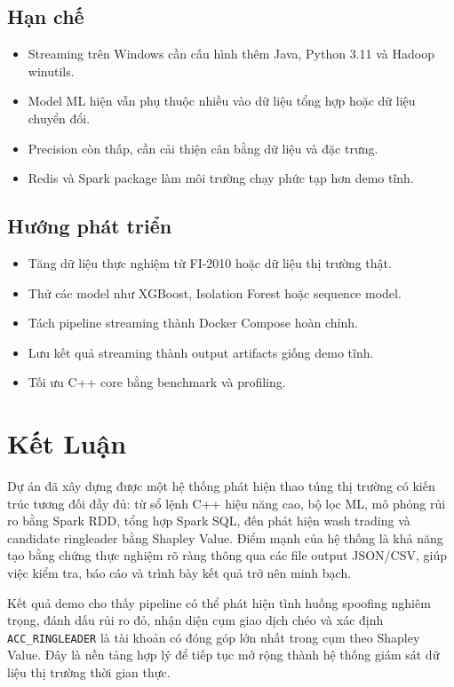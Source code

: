 \documentclass[12pt,a4paper]{report}
\begin{document}
\section{Hạn chế}

\begin{itemize}
    \item Streaming trên Windows cần cấu hình thêm Java, Python 3.11 và Hadoop winutils.
    \item Model ML hiện vẫn phụ thuộc nhiều vào dữ liệu tổng hợp hoặc dữ liệu chuyển đổi.
    \item Precision còn thấp, cần cải thiện cân bằng dữ liệu và đặc trưng.
    \item Redis và Spark package làm môi trường chạy phức tạp hơn demo tĩnh.
\end{itemize}

\section{Hướng phát triển}

\begin{itemize}
    \item Tăng dữ liệu thực nghiệm từ FI-2010 hoặc dữ liệu thị trường thật.
    \item Thử các model như XGBoost, Isolation Forest hoặc sequence model.
    \item Tách pipeline streaming thành Docker Compose hoàn chỉnh.
    \item Lưu kết quả streaming thành output artifacts giống demo tĩnh.
    \item Tối ưu C++ core bằng benchmark và profiling.
\end{itemize}

\chapter{Kết Luận}

Dự án đã xây dựng được một hệ thống phát hiện thao túng thị trường có kiến trúc tương đối đầy đủ: từ sổ lệnh C++ hiệu năng cao, bộ lọc ML, mô phỏng rủi ro bằng Spark RDD, tổng hợp Spark SQL, đến phát hiện wash trading và candidate ringleader bằng Shapley Value. Điểm mạnh của hệ thống là khả năng tạo bằng chứng thực nghiệm rõ ràng thông qua các file output JSON/CSV, giúp việc kiểm tra, báo cáo và trình bày kết quả trở nên minh bạch.

Kết quả demo cho thấy pipeline có thể phát hiện tình huống spoofing nghiêm trọng, đánh dấu rủi ro đỏ, nhận diện cụm giao dịch chéo và xác định \texttt{ACC\_RINGLEADER} là tài khoản có đóng góp lớn nhất trong cụm theo Shapley Value. Đây là nền tảng hợp lý để tiếp tục mở rộng thành hệ thống giám sát dữ liệu thị trường thời gian thực.
\end{document}
